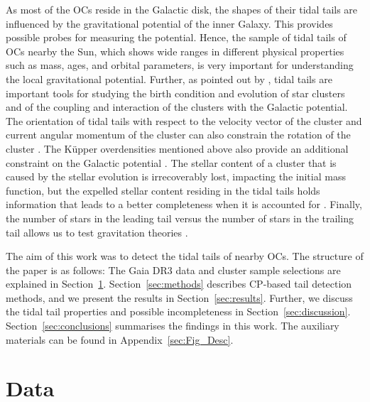 \documentclass{aa}
\begin{document}
As most of the OCs reside in the Galactic disk, the shapes of their tidal tails are influenced by the gravitational potential of the inner Galaxy. This provides possible probes for measuring the potential. Hence, the sample of tidal tails of OCs nearby the Sun, which shows wide ranges in different physical properties such as mass, ages, and orbital parameters, is very important for understanding the local gravitational potential. Further, as pointed out by \citet{2021A&A...655A..71Wang}, tidal tails are important tools for studying the birth condition and evolution of star clusters and of the coupling and interaction of the clusters with the Galactic potential. The orientation of tidal tails with respect to the velocity vector of the cluster and current angular momentum of the cluster can also constrain the rotation of the cluster \citep{2021A&A...647A.137Jerabkova, 2023A&A...673A.128Garcia}. 
The K{\"u}pper overdensities mentioned above also provide an additional constraint on the Galactic potential \citep{2015ApJ...803...80Kupper}.
The stellar content of a cluster that is caused by the stellar evolution is irrecoverably lost, impacting the initial mass function, but the expelled stellar content residing in the tidal tails holds information that leads to a better completeness when it is accounted for \citep{2024A&A...691A.227Wirth}. Finally, the number of stars in the leading tail versus the number of stars in the trailing tail allows us to test gravitation theories \citep{2022MNRAS.517.3613Kroupa,2024ApJ...970...94Kroupa,2024arXiv241113675Pflamm}. 

The aim of this work was to detect the tidal tails of nearby OCs. The structure of the paper is as follows: The Gaia DR3 data and cluster sample selections are explained in Section~\ref{sec:data}.
Section~\ref{sec:methods} describes CP-based tail detection methods, and we present the results in Section~\ref{sec:results}. Further, we discuss the tidal tail properties and possible incompleteness in Section~\ref{sec:discussion}. Section~\ref{sec:conclusions} summarises the findings in this work. The auxiliary materials can be found in Appendix~\ref{sec:Fig_Desc}. 


\section{Data} \label{sec:data}
\end{document}
